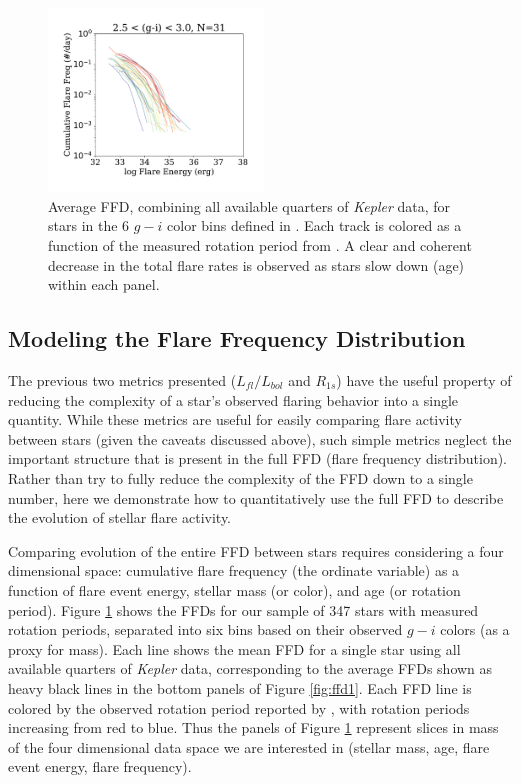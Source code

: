 \documentclass[preprint2]{aastex62}
\newcommand{\Kepler}{\textsl{Kepler}\xspace}
\begin{document}
\begin{figure}[!ht]
\includegraphics[width=2.25in]{fig7f}
\caption{
Average FFD, combining all available quarters of \Kepler data, for stars in the 6 $g-i$ color bins defined in \citet{davenport2016}. Each track is colored as a function of the measured rotation period from \citet{mcquillan2014}. A clear and coherent decrease in the total flare rates is observed as stars slow down (age) within each panel.
}
\label{fig:meanffd}
\end{figure}


\subsection{Modeling the Flare Frequency Distribution}
\label{sec:ffd}

The previous two metrics presented ($L_{fl}/L_{bol}$ and $R_{1s}$) have the useful property of reducing the complexity of a star's observed flaring behavior into a single quantity. While these metrics are useful for easily comparing flare activity between stars (given the caveats discussed above), such simple metrics neglect the important structure that is present in the full FFD (flare frequency distribution). Rather than try to fully reduce the complexity of the FFD down to a single number, here we demonstrate how to quantitatively use the full FFD to describe the evolution of stellar flare activity.


Comparing evolution of the entire FFD between stars requires considering a four dimensional space: cumulative flare frequency (the ordinate variable) as a function of flare event energy, stellar mass (or color), and age (or rotation period). 
Figure \ref{fig:meanffd} shows the FFDs for our sample of 347 stars with measured rotation periods, separated into six bins based on their observed $g-i$ colors (as a proxy for mass).
Each line shows the mean FFD for a single star using all available quarters of \Kepler data, corresponding to the average FFDs shown as heavy black lines in the bottom panels of Figure \ref{fig:ffd1}.
Each FFD line is colored by the observed rotation period reported by \citet{mcquillan2014}, with  rotation periods increasing from red to blue. Thus the panels of Figure \ref{fig:meanffd} represent slices in mass of the four dimensional data space we are interested in (stellar mass, age, flare event energy, flare frequency). 
\end{document}
